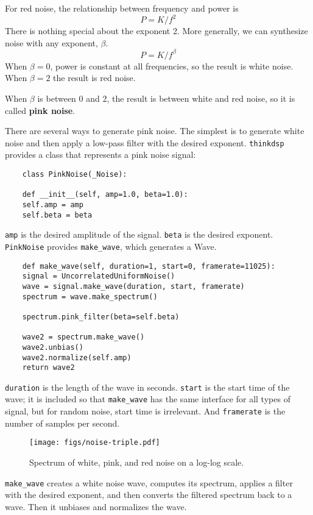 For red noise, the relationship between frequency
and power is
%
\[ P = K / f^{2} \]
%
There is nothing special about the exponent 2.  More generally,
we can synthesize noise with any exponent, $\beta$.
%
\[ P = K / f^{\beta} \]
%
When $\beta = 0$, power is constant at all frequencies,
so the result is white noise.  When $\beta=2$ the result is red noise.

When $\beta$ is between 0 and 2, the result is between white and
red noise, so it is called {\bf pink noise}.

There are several ways to generate pink noise.  The simplest is to
generate white noise and then apply a low-pass filter with the
desired exponent.  {\tt thinkdsp} provides a class that represents
a pink noise signal:

\begin{verbatim}
	class PinkNoise(_Noise):
	
	def __init__(self, amp=1.0, beta=1.0):
	self.amp = amp
	self.beta = beta
\end{verbatim}

{\tt amp} is the desired amplitude of the signal.
{\tt beta} is the desired exponent.  {\tt PinkNoise} provides
\verb"make_wave", which generates a Wave.

\begin{verbatim}
	def make_wave(self, duration=1, start=0, framerate=11025):
	signal = UncorrelatedUniformNoise()
	wave = signal.make_wave(duration, start, framerate)
	spectrum = wave.make_spectrum()
	
	spectrum.pink_filter(beta=self.beta)
	
	wave2 = spectrum.make_wave()
	wave2.unbias()
	wave2.normalize(self.amp)
	return wave2
\end{verbatim}

{\tt duration} is the length of the wave in seconds.  {\tt start} is
the start time of the wave; it is included so that \verb"make_wave"
has the same interface for all types of signal, but for random noise,
start time is irrelevant.  And {\tt framerate} is the number of
samples per second.

\begin{figure}
	\centerline{\texttt{[image: figs/noise-triple.pdf]}}
	\caption{Spectrum of white, pink, and red noise on a log-log scale.}
	\label{fig.noise-triple}
\end{figure}

\verb"make_wave" creates a white noise wave, computes its spectrum,
applies a filter with the desired exponent, and then converts the
filtered spectrum back to a wave.  Then it unbiases and normalizes
the wave.

